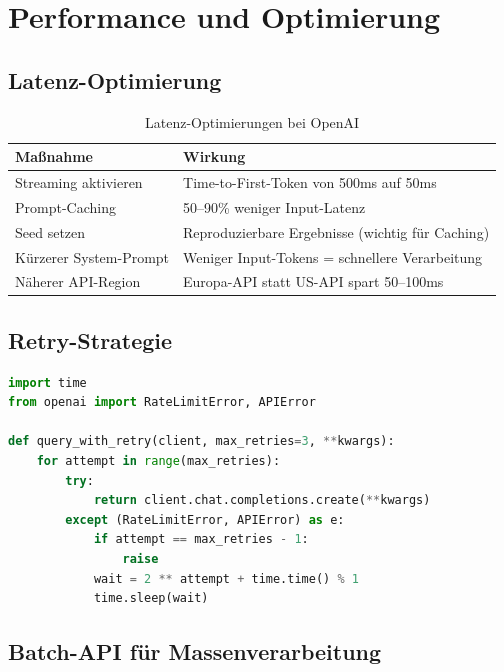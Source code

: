 \section{Performance und Optimierung}

\subsection{Latenz-Optimierung}

\begin{table}[H]
\centering
\begin{tabularx}{\linewidth}{lX}
\toprule
\textbf{Maßnahme} & \textbf{Wirkung} \\
\midrule
Streaming aktivieren & Time-to-First-Token von 500ms auf 50ms \\
Prompt-Caching & 50--90\% weniger Input-Latenz \\
Seed setzen & Reproduzierbare Ergebnisse (wichtig für Caching) \\
Kürzerer System-Prompt & Weniger Input-Tokens = schnellere Verarbeitung \\
Näherer API-Region & Europa-API statt US-API spart 50--100ms \\
\bottomrule
\end{tabularx}
\caption{Latenz-Optimierungen bei OpenAI}
\label{tab:latency-openai}
\end{table}

\subsection{Retry-Strategie}

\begin{lstlisting}[language=Python, caption={Retry mit Exponential Backoff}, label=lst:retry]
import time
from openai import RateLimitError, APIError

def query_with_retry(client, max_retries=3, **kwargs):
    for attempt in range(max_retries):
        try:
            return client.chat.completions.create(**kwargs)
        except (RateLimitError, APIError) as e:
            if attempt == max_retries - 1:
                raise
            wait = 2 ** attempt + time.time() % 1
            time.sleep(wait)
\end{lstlisting}

\subsection{Batch-API für Massenverarbeitung}

